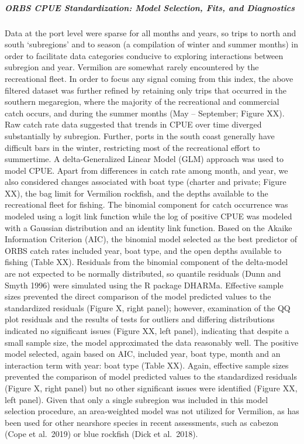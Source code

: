\documentclass[11pt,
  english,
  a4paper,
]{article}
\begin{document}
\hypertarget{orbs-cpue-standardization-model-selection-fits-and-diagnostics}{%
\subparagraph{ORBS CPUE Standardization: Model Selection, Fits, and Diagnostics}\label{orbs-cpue-standardization-model-selection-fits-and-diagnostics}}

\leavevmode\tagmcend\tagstructend


Data at the port level were sparse for all months and years, so trips to north and south `subregions' and to season (a compilation of winter and summer months) in order to facilitate data categories conducive to exploring interactions between subregion and year. Vermilion are somewhat rarely encountered by the recreational fleet. In order to focus any signal coming from this index, the above filtered dataset was further refined by retaining only trips that occurred in the southern megaregion, where the majority of the recreational and commercial catch occurs, and during the summer months (May -- September; Figure XX). Raw catch rate data suggested that trends in CPUE over time diverged substantially by subregion. Further, ports in the south coast generally have difficult bars in the winter, restricting most of the recreational effort to summertime. A delta-Generalized Linear Model (GLM) approach was used to model CPUE. Apart from differences in catch rate among month, and year, we also considered changes associated with boat type (charter and private; Figure XX), the bag limit for Vermilion rockfish, and the depths available to the recreational fleet for fishing. The binomial component for catch occurrence was modeled using a logit link function while the log of positive CPUE was modeled with a Gaussian distribution and an identity link function. Based on the Akaike Information Criterion (AIC), the binomial model selected as the best predictor of ORBS catch rates included year, boat type, and the open depths available to fishing (Table XX). Residuals from the binomial component of the delta-model are not expected to be normally distributed, so quantile residuals (Dunn and Smyth 1996) were simulated using the R package DHARMa. Effective sample sizes prevented the direct comparison of the model predicted values to the standardized residuals (Figure X, right panel); however, examination of the QQ plot residuals and the results of tests for outliers and differing distributions indicated no significant issues (Figure XX, left panel), indicating that despite a small sample size, the model approximated the data reasonably well. The positive model selected, again based on AIC, included year, boat type, month and an interaction term with year: boat type (Table XX). Again, effective sample sizes prevented the comparison of model predicted values to the standardized residuals (Figure X, right panel) but no other significant issues were identified (Figure XX, left panel). Given that only a single subregion was included in this model selection procedure, an area-weighted model was not utilized for Vermilion, as has been used for other nearshore species in recent assessments, such as cabezon (Cope et al.~2019) or blue rockfish (Dick et al.~2018).
\end{document}
